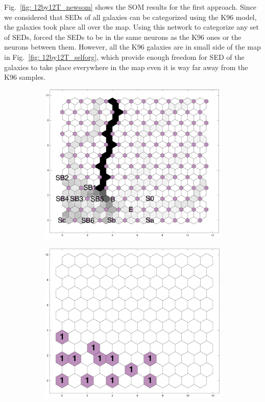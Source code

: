     Fig.~\ref{fig: 12by12T_newsom} shows the SOM results for the first approach. 
    Since we considered that SEDs of all galaxies can be categorized using the K96 model, the galaxies took place all over the map.
    Using this network to categorize any set of SEDs, forced the SEDs to be in the same neurons as the K96 ones or the neurons between them.
    However, all the K96 galaxies are in small side of the map in Fig.~\ref{fig: 12by12T_selforg}, which provide enough freedom for SED of the galaxies to take place everywhere in the map even it is way far away from the K96 samples.
    
    \begin{figure}
        \begin{subfigure}[b]{0.5\textwidth}
            \centering
            \includegraphics[width=\textwidth]{../images0.01/2d/dist_12_by_self_org_res12.png}
        \end{subfigure}
        \hfill
        \begin{subfigure}[b]{0.5\textwidth}
            \includegraphics[width=\textwidth]{../images0.01/2d/hit_t_12_by_self_org_res12.png}

\end{subfigure}
\end{figure}
